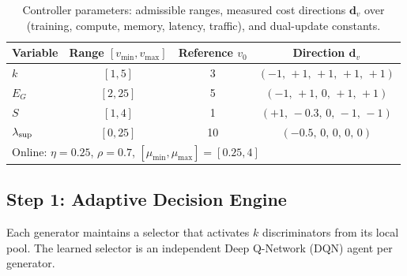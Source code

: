 \documentclass[journal]{IEEEtran}
\newcommand{\vd}{\mathbf{d}}
\begin{document}
\begin{table}[!t]
\centering
\caption{Controller parameters: admissible ranges, measured cost directions
$\vd_v$ over (training, compute, memory, latency, traffic), and dual-update
constants.}
\label{tab:ctrl}
\footnotesize
\begin{tabular}{lccc}
\toprule
Variable & Range $[v_{\min},v_{\max}]$ & Reference $v_0$ & Direction $\vd_v$ \\
\midrule
$k$ & $[1,5]$ & 3 & $(-1,\,+1,\,+1,\,+1,\,+1)$ \\
$E_G$ & $[2,25]$ & 5 & $(-1,\,+1,\,0,\,+1,\,+1)$ \\
$S$ & $[1,4]$ & 1 & $(+1,\,-0.3,\,0,\,-1,\,-1)$ \\
$\lambda_{\rm sup}$ & $[0,25]$ & 10 & $(-0.5,\,0,\,0,\,0,\,0)$ \\
\midrule
\multicolumn{4}{l}{Online: $\eta=0.25$, $\rho=0.7$, $[\mu_{\min},\mu_{\max}]=[0.25,4]$} \\
\bottomrule
\end{tabular}
\end{table}

\subsection{Step 1: Adaptive Decision Engine}
\label{sec:step1}
Each generator maintains a selector that activates $k$ discriminators from its
local pool. The learned selector is an independent Deep Q-Network (DQN) agent
per generator.
\end{document}
